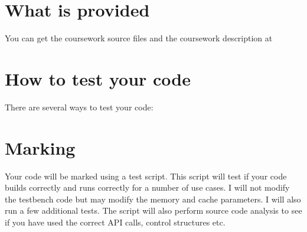 \documentclass[11pt]{article}
\begin{document}
\section{What is provided}\label{what-is-provided}

You can get the coursework source files and the coursework description at


\section{How to test your code}\label{how-to-test-your-code}

There are several ways to test your code:

\section{Marking}\label{marking}



Your code will be marked using a test script. This script will test if your code builds correctly and runs correctly for a number of use cases. I will not modify the testbench code but may modify the memory and cache parameters. I will also run a few additional tests.
The script will also perform source code analysis to see if you have used the correct API calls, control structures etc. 
\end{document}
